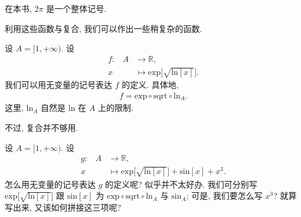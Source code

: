 \begin{remark}
    在本书, $2\pi$ 是一个整体记号.
\end{remark}

利用这些函数与复合, 我们可以作出一些稍复杂的函数.

\begin{example}
    设 $A = [1, +\infty)$. 设
    \begin{align*}
        \text{$f$:} \quad
        A & \to \mathbb{R},                                                \\
        x & \mapsto \mathrm{exp} {\bigg[ \sqrt{\mathrm{ln} {[x]}} \bigg]}.
    \end{align*}
    我们可以用无变量的记号表达 $f$ 的定义. 具体地,
    \begin{align*}
        f = \mathrm{exp} \circ \mathrm{sqrt} \circ \mathrm{ln}_{A}.
    \end{align*}
    这里, $\mathrm{ln}_{A}$ 自然是 $\mathrm{ln}$ 在 $A$ 上的限制.
\end{example}

不过, 复合并不够用.

\begin{example}
    设 $A = [1, +\infty)$. 设
    \begin{align*}
        \text{$g$:} \quad
        A & \to \mathbb{R},                                                                           \\
        x & \mapsto \mathrm{exp} {\bigg[ \sqrt{\mathrm{ln} {[x]}} \bigg]} + \mathrm{sin} {[x]} + x^3.
    \end{align*}
    怎么用无变量的记号表达 $g$ 的定义呢? 似乎并不太好办. 我们可分别写 $\mathrm{exp} {\bigg[ \sqrt{\mathrm{ln} {[x]}} \bigg]}$ 跟 $\mathrm{sin} {[x]}$ 为 $\mathrm{exp} \circ \mathrm{sqrt} \circ \mathrm{ln}_{A}$ 与 $\mathrm{sin}_A$; 可是, 我们要怎么写 $x^3$? 就算写出来, 又该如何拼接这三项呢?
\end{example}

